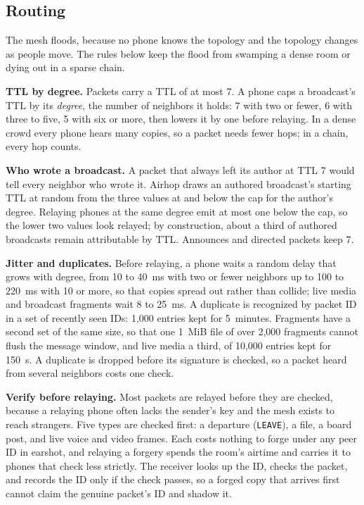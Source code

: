 \documentclass[conference]{IEEEtran}
\newcommand{\code}[1]{\texttt{#1}}
\begin{document}
\subsection{Routing}
\label{sec:routing}

The mesh floods, because no phone knows the topology and the topology changes as people move. The rules below keep the flood from swamping a dense room or dying out in a sparse chain.

\textbf{TTL by degree.} Packets carry a TTL of at most 7. A phone caps a broadcast's TTL by its \emph{degree}, the number of neighbors it holds: 7 with two or fewer, 6 with three to five, 5 with six or more, then lowers it by one before relaying. In a dense crowd every phone hears many copies, so a packet needs fewer hops; in a chain, every hop counts.

\textbf{Who wrote a broadcast.} A packet that always left its author at TTL 7 would tell every neighbor who wrote it. Airhop draws an authored broadcast's starting TTL at random from the three values at and below the cap for the author's degree. Relaying phones at the same degree emit at most one below the cap, so the lower two values look relayed; by construction, about a third of authored broadcasts remain attributable by TTL. Announces and directed packets keep 7.

\textbf{Jitter and duplicates.} Before relaying, a phone waits a random delay that grows with degree, from 10 to 40~ms with two or fewer neighbors up to 100 to 220~ms with 10 or more, so that copies spread out rather than collide; live media and broadcast fragments wait 8 to 25~ms. A duplicate is recognized by packet ID in a set of recently seen IDs: 1,000 entries kept for 5~minutes. Fragments have a second set of the same size, so that one 1~MiB file of over 2,000 fragments cannot flush the message window, and live media a third, of 10,000 entries kept for 150~s. A duplicate is dropped before its signature is checked, so a packet heard from several neighbors costs one check.

\textbf{Verify before relaying.} Most packets are relayed before they are checked, because a relaying phone often lacks the sender's key and the mesh exists to reach strangers. Five types are checked first: a departure (\code{LEAVE}), a file, a board post, and live voice and video frames. Each costs nothing to forge under any peer ID in earshot, and relaying a forgery spends the room's airtime and carries it to phones that check less strictly. The receiver looks up the ID, checks the packet, and records the ID only if the check passes, so a forged copy that arrives first cannot claim the genuine packet's ID and shadow it.
\end{document}
